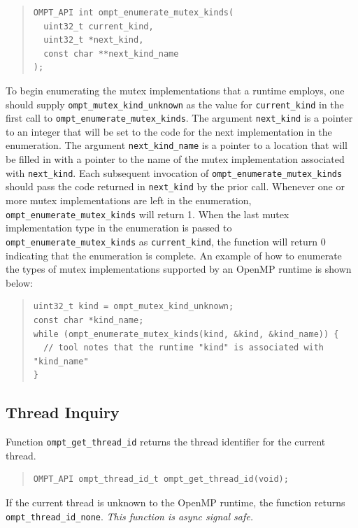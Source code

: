 \documentclass{article}
\begin{document}
\begin{quote}
\begin{verbatim}
OMPT_API int ompt_enumerate_mutex_kinds(
  uint32_t current_kind, 
  uint32_t *next_kind, 
  const char **next_kind_name
);
\end{verbatim}
\end{quote}

\noindent
\sloppy
To begin enumerating the mutex implementations that a runtime  employs, one should supply 
 \verb|ompt_mutex_kind_unknown| as the value for \verb|current_kind| in the first call to \verb|ompt_enumerate_mutex_kinds|.
The argument \verb|next_kind| is a pointer to an integer that will be set to the code for the next implementation in the enumeration.
The argument \verb|next_kind_name| is a pointer to a location that will be filled in with a pointer to the name of the mutex implementation associated with \verb|next_kind|. 
Each subsequent invocation of \verb|ompt_enumerate_mutex_kinds| should pass the code returned in \verb|next_kind| by the prior call.
Whenever one or more mutex implementations are left in the enumeration, \verb|ompt_enumerate_mutex_kinds| will return 1.
When the last mutex implementation type in the enumeration is passed to \verb|ompt_enumerate_mutex_kinds| as \verb|current_kind|, 
the function will return 0 indicating that the enumeration is complete.
An example of how to enumerate the types of mutex implementations supported by an OpenMP runtime is shown below:

\begin{quote}
\begin{verbatim}
uint32_t kind = ompt_mutex_kind_unknown;
const char *kind_name;
while (ompt_enumerate_mutex_kinds(kind, &kind, &kind_name)) {
  // tool notes that the runtime "kind" is associated with "kind_name" 
}
\end{verbatim}
\end{quote}


\subsection{Thread Inquiry}
\label{sec:thread-inquiry}

Function \verb|ompt_get_thread_id| returns the thread identifier for the 
current thread.
\begin{quote}
\begin{verbatim}
OMPT_API ompt_thread_id_t ompt_get_thread_id(void);
\end{verbatim}
\end{quote}
If the current thread is unknown to the OpenMP runtime, the function returns \verb|ompt_thread_id_none|.
{\em This function is async signal safe.}
\end{document}
